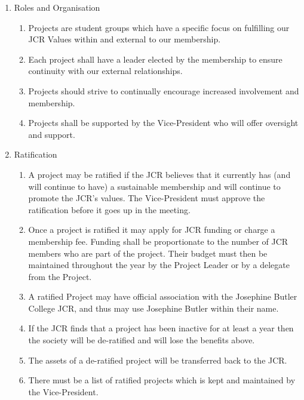 \begin{enumerate}
    \item Roles and Organisation
    \begin{enumerate}
        \item Projects are student groups which have a specific focus on fulfilling our JCR Values within and external to our membership. 
        \item Each project shall have a leader elected by the membership to ensure continuity with our external relationships. 
        \item Projects should strive to continually encourage increased involvement and membership.  
        \item Projects shall be supported by the Vice-President who will offer oversight and support. 
    \end{enumerate}
    \item Ratification
    \begin{enumerate}
        \item A project may be ratified if the JCR believes that it currently has (and will continue to have) a sustainable membership and will continue to promote the JCR’s values. The Vice-President must approve the ratification before it goes up in the meeting.  
        \item Once a project is ratified it may apply for JCR funding or charge a membership fee. Funding shall be proportionate to the number of JCR members who are part of the project. Their budget must then be maintained throughout the year by the Project Leader or by a delegate from the Project. 
        \item A ratified Project may have official association with the Josephine Butler College JCR, and thus may use Josephine Butler within their name.  
        \item If the JCR finds that a project has been inactive for at least a year then the society will be de-ratified and will lose the benefits above.  
        \item The assets of a de-ratified project will be transferred back to the JCR. 
        \item There must be a list of ratified projects which is kept and maintained by the Vice-President.
    \end{enumerate}
\end{enumerate}

